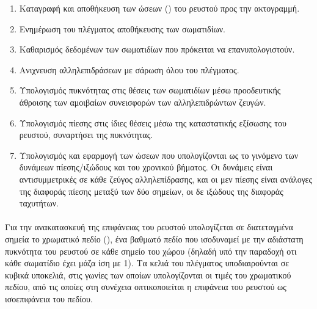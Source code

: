 \begin{enumerate}
\item Καταγραφή και αποθήκευση των ώσεων () του ρευστού προς την ακτογραμμή.

\item Ενημέρωση του πλέγματος αποθήκευσης των σωματιδίων.

\item Καθαρισμός δεδομένων των σωματιδίων που πρόκειται να επανυπολογιστούν.

\item Ανιχνευση αλληλεπιδράσεων με σάρωση όλου του πλέγματος.

\item Υπολογισμός πυκνότητας στις θέσεις των σωματιδίων μέσω προοδευτικής άθροισης των
  αμοιβαίων συνεισφορών των αλληλεπιδρώντων ζευγών.

\item Υπολογισμός πίεσης στις ίδιες θέσεις μέσω της καταστατικής εξίσωσης του ρευστού,
  συναρτήσει της πυκνότητας.

\item Υπολογισμός και εφαρμογή των ώσεων που υπολογίζονται ως το γινόμενο των δυνάμεων
  πίεσης/ιξώδους και του χρονικού βήματος. Οι δυνάμεις είναι αντισυμμετρικές σε κάθε
  ζεύγος αλληλεπίδρασης, και οι μεν πίεσης είναι ανάλογες της διαφοράς πίεσης μεταξύ των
  δύο σημείων, οι δε ιξώδους της διαφοράς ταχυτήτων.
\end{enumerate}

\paragraph{} Για την ανακατασκευή της επιφάνειας του ρευστού υπολογίζεται σε διατεταγμένα
σημεία το χρωματικό πεδίο (), ένα βαθμωτό πεδίο που ισοδυναμεί με την
αδιάστατη πυκνότητα του ρευστού σε κάθε σημείο του χώρου (δηλαδή υπό την παραδοχή οτι κάθε
σωματίδιο έχει μάζα ίση με 1). Τα κελιά του πλέγματος υποδιαιρούνται σε κυβικά υποκελιά,
στις γωνίες των οποίων υπολογίζονται οι τιμές του χρωματικού πεδίου, από τις οποίες στη
συνέχεια οπτικοποιείται η επιφάνεια του ρευστού ως ισοεπιφάνεια του πεδίου.


